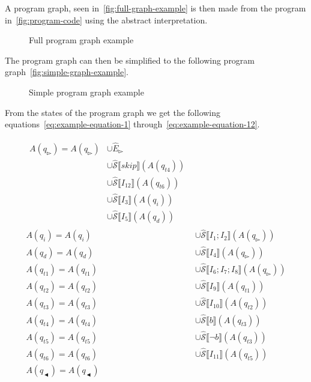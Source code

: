 A program graph, seen in~\autoref{fig:full-graph-example} is then made from the program in~\autoref{fig:program-code} using the abstract interpretation.

\begin{figure}
    \centering
    
    \caption[short]{Full program graph example}
    \label{fig:full-graph-example}
\end{figure}


The program graph can then be simplified to the following program graph~\autoref{fig:simple-graph-example}.

\begin{figure}
    \centering
    
    \caption[short]{Simple program graph example}
    \label{fig:simple-graph-example}
\end{figure}

From the states of the program graph we get the following equations~\autoref{eq:example-equation-1} through~\autoref{eq:example-equation-12}.

\begin{align}
    \begin{split} \label{eq:example-equation-1}
        A(q_\whitepointerright)=A(q_\whitepointerright) &\cup \hat E_\whitepointerright \\&\cup \mathcal{\hat S} \lBrack skip \rBrack(A(q_{t4}))\\&\cup \mathcal{\hat S} \lBrack I_{12} \rBrack (A(q_{t6})) \\&\cup \mathcal{\hat S} \lBrack I_3 \rBrack (A(q_i)) \\&\cup \mathcal{\hat S} \lBrack I_5 \rBrack (A(q_d))
    \end{split}\\
    A(q_i)=A(q_i)&\cup \mathcal{\hat S} \lBrack I_1;I_2 \rBrack (A(q_\whitepointerright ))\\
    A(q_d)=A(q_d)&\cup \mathcal{\hat S} \lBrack I_4 \rBrack (A(q_\whitepointerright ))\\
    A(q_{t1})=A(q_{t1})&\cup \mathcal{\hat S} \lBrack I_6;I_7;I_8 \rBrack (A(q_\whitepointerright))\\
    A(q_{t2})=A(q_{t2})&\cup \mathcal{\hat S} \lBrack I_9 \rBrack (A(q_{t1}))\\
    A(q_{t3})=A(q_{t3})&\cup \mathcal{\hat S} \lBrack I_{10} \rBrack (A(q_{t2}))\\
    A(q_{t4})=A(q_{t4})&\cup \mathcal{\hat S} \lBrack b \rBrack (A(q_{t3}))\\
    A(q_{t5})=A(q_{t5})&\cup \mathcal{\hat S} \lBrack \neg b \rBrack (A(q_{t3}))\\
    A(q_{t6})=A(q_{t6})&\cup \mathcal{\hat S} \lBrack I_{11} \rBrack (A(q_{t5}))\\
    A(q_\blackpointerleft)=A(q_\blackpointerleft) \label{eq:example-equation-12}
\end{align}
    
